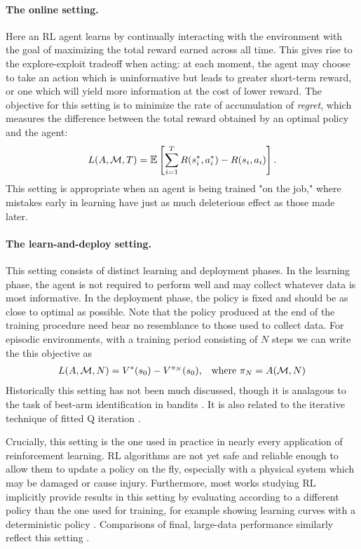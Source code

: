 \paragraph{The online setting.}
Here an RL agent learns by continually interacting with the environment with the goal of maximizing the total reward earned across all time.
This gives rise to the explore-exploit tradeoff when acting: at each moment, the agent may choose to take an action which is uninformative but leads to greater short-term reward, or one which will yield more information at the cost of lower reward.
The objective for this setting is to minimize the rate of accumulation of \emph{regret}, which measures the difference between the total reward obtained by an optimal policy and the agent:
\begin{align}
    L(A, \mdp, T) = \E \left[ \sum_{i=1}^T R(s^*_i, a^*_i) - R(s_i, a_i) \right].
\end{align}
This setting is appropriate when an agent is being trained "on the job," where mistakes early in learning have just as much deleterious effect as those made later.


\paragraph{The learn-and-deploy setting.}
This setting consists of distinct learning and deployment phases.
In the learning phase, the agent is not required to perform well and may collect whatever data is most informative.
In the deployment phase, the policy is fixed and should be as close to optimal as possible.
Note that the policy produced at the end of the training procedure need bear no resemblance to those used to collect data.
For episodic environments, with a training period consisting of $N$ steps we can write the this objective as
\begin{align}
    L(A, \mathcal{M}, N) = V^*(s_0) - V^{\pi_N}(s_0), && \text{where } \pi_N = A(\mathcal{M}, N)
\end{align}
Historically this setting has not been much discussed, though it is analagous to the task of best-arm identification in bandits \citep{Russo2016SimpleBA,Kaufmann2016OnTC}.
It is also related to the iterative technique of fitted Q iteration \citep{Ernst2005TreeBasedBM,Riedmiller2005NeuralFQ}.

Crucially, this setting is the one used in practice in nearly every application of reinforcement learning.
RL algorithms are not yet safe and reliable enough to allow them to update a policy on the fly, especially with a physical system which may be damaged or cause injury.
Furthermore, most works studying RL implicitly provide results in this setting by evaluating according to a different policy than the one used for training, for example showing learning curves with a deterministic policy \citep{Mnih2015HumanlevelCT,Lillicrap2016ContinuousCW,Fujimoto2018AddressingFA,haarnoja2018soft}.
Comparisons of final, large-data performance similarly reflect this setting \citep{Silver2016MasteringTG,Vinyals2019GrandmasterLI,openai2019dota,OpenAI2019SolvingRC}.


